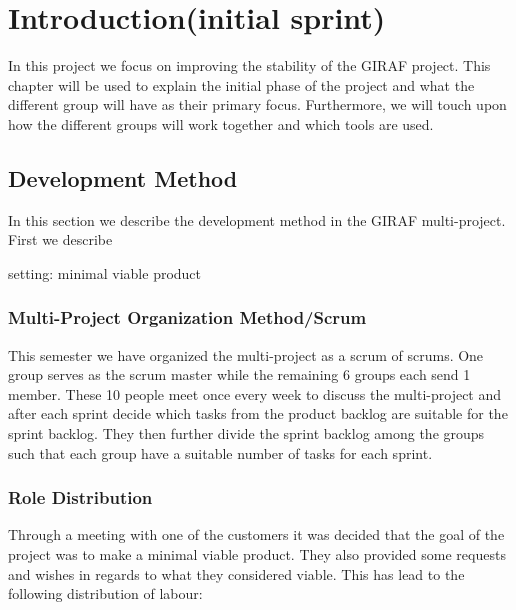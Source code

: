 \chapter{Introduction(initial sprint)}

In this project we focus on improving the stability of the GIRAF project. This
chapter will be used to explain the initial phase of the project and what the
different group will have as their primary focus. Furthermore, we will touch
upon how the different groups will work together and which tools are used.


\section{Development Method}
In this section we describe the development method in the GIRAF multi-project.
First we describe 



setting: minimal viable product



\subsection{Multi-Project Organization Method/Scrum}
 This semester we have organized the multi-project as a scrum of
scrums. One group serves as the scrum master while the remaining 6 groups each send 1
member. These 10 people meet once every week to discuss the multi-project
and after each sprint decide which tasks from the product backlog are suitable
for the sprint backlog. They then further divide the sprint backlog among the
groups such that each group have a suitable number of tasks for each sprint.\nl



\subsection{Role Distribution}

Through a meeting with one of the customers it was decided that the goal of the
project was to make a minimal viable product. They also provided some requests
and wishes in regards to what they considered viable. This has lead to the
following distribution of labour:


